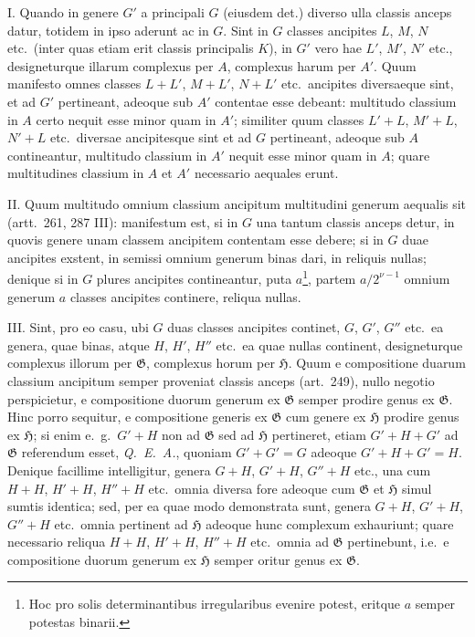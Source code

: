 \documentclass[12pt,a4paper]{article}
\theoremstyle{plain}
\theoremstyle{definition}
\theoremstyle{remark}
\begin{document}
\textsc{I.} Quando in genere $G'$ a principali $G$ (eiusdem det.) diverso ulla classis anceps datur, totidem in ipso aderunt ac in $G$. Sint in $G$ classes ancipites $L$, $M$, $N$ etc.~(inter quas etiam erit classis principalis $K$), in $G'$ vero hae $L'$, $M'$, $N'$ etc., designeturque illarum complexus per $A$, complexus harum per $A'$. Quum manifesto omnes classes $L+L'$, $M+L'$, $N+L'$ etc.~ancipites diversaeque sint, et ad $G'$ pertineant, adeoque sub $A'$ contentae esse debeant: multitudo classium in $A$ certo nequit esse minor quam in $A'$; similiter quum classes $L'+L$, $M'+L$, $N'+L$ etc.~diversae ancipitesque sint et ad $G$ pertineant, adeoque sub $A$ contineantur, multitudo classium in $A'$ nequit esse minor quam in $A$; quare multitudines classium in $A$ et $A'$ necessario aequales erunt.

\textsc{II.} Quum multitudo omnium classium ancipitum multitudini generum aequalis sit (artt.~261, 287 III): manifestum est, si in $G$ una tantum classis anceps detur, in quovis genere unam classem ancipitem contentam esse debere; si in $G$ duae ancipites exstent, in semissi omnium generum binas dari, in reliquis nullas; denique si in $G$ plures ancipites contineantur, puta $a$\footnote{Hoc pro solis determinantibus irregularibus evenire potest, eritque $a$ semper potestas binarii.}, partem $a/2^{\nu-1}$ omnium generum $a$ classes ancipites continere, reliqua nullas.

\textsc{III.} Sint, pro eo casu, ubi $G$ duas classes ancipites continet, $G$, $G'$, $G''$ etc.~ea genera, quae binas, atque $H$, $H'$, $H''$ etc.~ea quae nullas continent, designeturque complexus illorum per $\mathfrak{G}$, complexus horum per $\mathfrak{H}$. Quum e compositione duarum classium ancipitum semper proveniat classis anceps (art.~249), nullo negotio perspicietur, e compositione duorum generum ex $\mathfrak{G}$ semper prodire genus ex $\mathfrak{G}$. Hinc porro sequitur, e compositione generis ex $\mathfrak{G}$ cum genere ex $\mathfrak{H}$ prodire genus ex $\mathfrak{H}$; si enim e.~g.~$G'+H$ non ad $\mathfrak{G}$ sed ad $\mathfrak{H}$ pertineret, etiam $G'+H+G'$ ad $\mathfrak{G}$ referendum esset, \textit{Q.~E.~A.}, quoniam $G'+G' = G$ adeoque $G'+H+G' = H$. Denique facillime intelligitur, genera $G+H$, $G'+H$, $G''+H$ etc., una cum $H+H$, $H'+H$, $H''+H$ etc.~omnia diversa fore adeoque cum $\mathfrak{G}$ et $\mathfrak{H}$ simul sumtis identica; sed, per ea quae modo demonstrata sunt, genera $G+H$, $G'+H$, $G''+H$ etc.~omnia pertinent ad $\mathfrak{H}$ adeoque hunc complexum exhauriunt; quare necessario reliqua $H+H$, $H'+H$, $H''+H$ etc.~omnia ad $\mathfrak{G}$ pertinebunt, i.e.~e compositione duorum generum ex $\mathfrak{H}$ semper oritur genus ex $\mathfrak{G}$.
\end{document}
